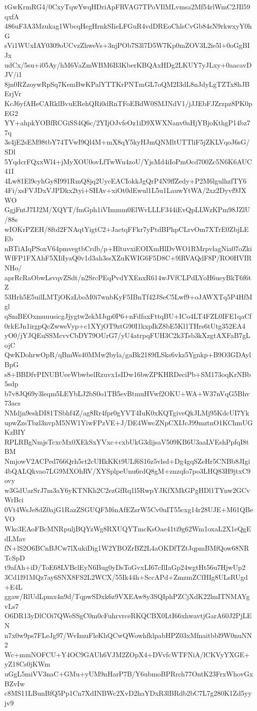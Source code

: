 tGwKrmRG4/0CxyTqwYwqHDriApFRVAG7TPoVIlMLvmsa2Mf54rlWmC2JIl59qxfA
486uF3A3Mzukag1WbcqHegHrnkSIieLFGuR4vdDREoChlsCvGb84sN9rkwxyY0hG
sVi1WUxIAY0309oUCvzZhweVs+3njPOb7S3l7D5W7Kp0mZOV3L2ie5l+0oGgBIJx
udCx/5su+i05Ay/hM6VaZmWBM6B3KberKBQAxHDg2LKUY7yJLxy+0aacavDJV/i1
8jn0RZzoywRpSq7KemBwKPalYTTKrPNTmGL7oQM2I3dL8nJdyLgTZTx8hJBErjVr
KcJ6yfAHeCARklBvuERehQRi0dRnTFoEBdW0SMJNdV1/jJJEbFJZrzpz8PK0pEG2
YY+ahpkYOBfRCGiSS4Q6c/2YIjOJvfeOz1iD9XWXNanv0aHjYBjoKthgP14bz77q
3s4jE2sEM98tbY74TVwI9Ql4M+mX8qY5kyHJmQNMltUTTliF5jZKLVqoJ6sG/SDl
5YqdcrFQxxWl4+jMyXOU0ovLfTwWu4zoU/YjsMd4iIoPmOcd700Zc5N6K6AUC41I
4Lw81El9cyhGy8I991RmQ8jq2UycEACIokkJgQrP4N9ffZedy+P2M6lgulhzfTY6
4Fi/xsFVJDxVJPDkx2tyi+SHAv+xiOt0dEwul1L5u1LauwYtWA/2xz2Dyvf9JXWO
GgjFntJ7IJ2M/XQYT/fmGph1iVImmm0ElWvLLLF344iEvQpLLWzKPm98JZlU/88s
wIOKrPZEH/8ftd2FNAqtYigtC2+JactqFFkr7yPtdBPhpCLrvOm7XTrE0ZbjLEEb
nBTiAIqPSoxV64pmvegtbCrdb/p+HltuvxiEOIXmHlDvWO1RMrpvlagNia07oZki
WfFP1FXAhF5XIiIyaQ0v1d3ah3ssXZuKWIG6F5D8C+9lRVAQdF8P/RO0HVIRNHo/
aprRcRaObwLsvqvZSdt/n2SrcPEqPvdYXEnxR614wJVfCLPdLYoH6ueyBkT6f6tZ
53Hrh5E5uilLMTjOKzLboM0i7wnbKyF5IBnTf42JSeC5Lwf9+oJAWXTq5P4HfMgl
qSmBEOxmuuusicgJjygtw2ekMJqp0P6+nFdfaxFttqBU+ICo4LT4FZL0IFE1qaCf
0rkEJn1irgpQcZwweVyp+c1XYjOT9ztG90I1kxpIkZ8bE5Kl1THrs6tUtg352EA4
yO0/jYJQEuSSMcvvCbDY79OUrG7/yU4atrpqFUH3C2k3Tsb3kXzgtAXFaB7gLojC
QwKDohrwOpR/qBmWs40MMw2byla/gaBk2189fLSks6vkz5Ygnkp+B9O3GDAylBpG
s8+BBDfvPINUBUeeWbwbelRzuvx1sIDw16bwZPKHRDeciPb+SM173oqKrNBb5sdp
b7v8JQ69y3leqm5LEYbLJ2bS0o1TB5evBtmuHVwf2OKU+WA+W37nVqG5Bhv73acs
NMdjn9eskDI81TSbhf4Z/ag8Rr4fpr0gYVT4IuK0xKQTgiveQkJLMj95KdcUI7Yk
upwZzsTbzl3nvpM5NW1YiwFPzVE+J/DE4WwcZNpCXIJcJ99mztnO1KChmUGKzBIY
RPLRBgNmjsTcxcMx0XEkSxYVxc+cxbUkG3dijsaV509KB6U3aaLVEshPpfqI8tBM
NmjowV2ACPed766Qrh5ct2cUHkKKt9ULf6S16z5vlsd+Dg4gqSZeHr5CNBb8JIgi
4bQALQkvao7LG9MXOhRV/XYSplpeUnu6rdQ8gM+znzqfo7po3LHQ83H9jtxC9ovy
w3GdUarSrJ7m3aY6yKTNKh2C2ezGfRq1l5RwpYJKfXMkGPgHDl1TYnw2GCvWrBci
0Vt4WsJe8dZ0ajG1RazZSGUQFM6nAfEZsrW5Cv0uIT55cxg14r28UJE+M61QBeVO
Wkc3EAoFBcMNRpuljBQYzWg8RXUQYTmcKsOae41ti9g62Wm1oxaL2X1eQgEdLMav
fN+lS2O6BCnBJCw7lXukiDig1W2YBOZrBZ2L4aOKDfTZtJqpmBMfQow68NRTcSpD
t9afAh+iD/ToE68LVBclEyN6Bug0yDsToGvxLI67cIlIaGp24wgtHt56u7HjwUp2
3Cd1l91MQz7ay6SNX8FS2L2WCX/55Ik44h+SccAPd+ZmzmZCfHIg8ULsRUgd+E4L
ggaw/RlUdLpmx4n9d/TqpwSDxk6z9VXEAw8y3SQIphPZCjXdK22lmITNMAYgvLs7
O6DR13yDlCOi7QWeSSgC0m0cFuhrvrceRKQCBX0LtI66xhwavtjGarA60J2PjLEN
n7x0w9ps7FLeJg97/WvImuFleKhQCwQWowhfklpabHPZ03xMfnaitbbl9W0nuNN2
Wc+mmNOFCU+Y4OC9GAUh6VJM2ZOpX4+DVvfcWTFNiA/lCKVyYXGE+yZ18Cs0jKWm
uGgL5miVV3naC+GMu+yUM9nHarP7B/Y6ubmoBPRrch77OntK23FrxWhovGxBZvIw
c8MS11LBunBfQ5Pp1Cn7XdINBWc2XvD2haYDxR3lBRdb2bC7L7g280K1Zd5yyjv9
